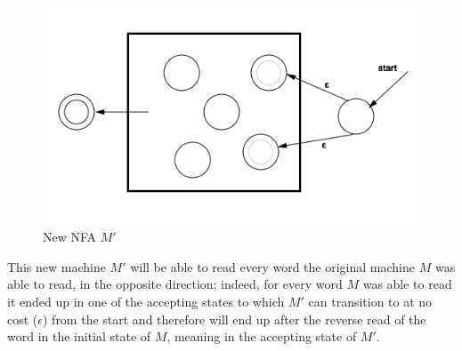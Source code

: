 \begin{figure}[H]
\centering
\includegraphics[scale=0.6]{NFA}
\caption{New NFA $M'$}
\end{figure}


This new machine $M'$ will be able to read every word the original machine $M$ was able to read, in the opposite direction; indeed, for every word $M$ was able to read it ended up in one of the accepting states to which $M'$ can transition to at no cost ($\epsilon$) from the start and therefore will end up after the reverse read of the word in the initial state of $M$, meaning in the accepting state of $M'$.


